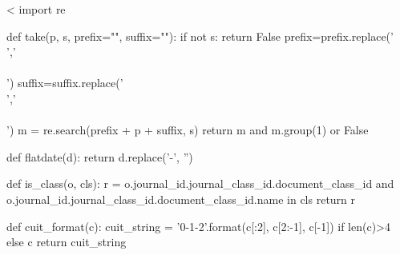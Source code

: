 \documentclass{article}
\begin{document}
<%
    import re

    def take(p, s, prefix="", suffix=""):
        if not s: return False
	prefix=prefix.replace('\\','\\\\')
	suffix=suffix.replace('\\','\\\\')
        m = re.search(prefix + p + suffix, s)
        return m and m.group(1) or False

    def flatdate(d):
        return d.replace('-', '')

    def is_class(o, cls):
        r = o.journal_id.journal_class_id.document_class_id and o.journal_id.journal_class_id.document_class_id.name in cls
        return r

    def cuit_format(c):
	cuit_string = '{0}-{1}-{2}'.format(c[:2], c[2:-1], c[-1]) if len(c)>4 else c
        return cuit_string



\end{document}
